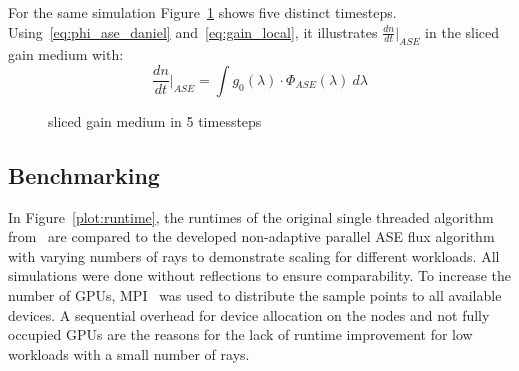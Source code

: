 For the same simulation Figure~\ref{graphic:benchmark_4_timeslices} shows five distinct timesteps.
Using~\eqref{eq:phi_ase_daniel} and~\eqref{eq:gain_local}, it illustrates ${\frac{dn}{dt}|}_{ASE}$ in the sliced gain medium with:
\begin{equation}
  \label{eq:dndt}
  \frac{dn}{dt}\bigg|_{ASE} = \int g_0(\lambda) \cdot \Phi_{ASE}(\lambda)~d\lambda
\end{equation}
\begin{figure}[H]
  \centerline{
    }
  \caption{sliced gain medium in 5 timessteps}
\label{graphic:benchmark_4_timeslices}
\end{figure}

\subsection{Benchmarking}
\label{subsec:benchmarking}
In Figure~\ref{plot:runtime}, the runtimes of the original single threaded
algorithm from~\cite{ASE2010} are compared to the developed non-adaptive
parallel ASE flux algorithm with varying numbers of rays to demonstrate
scaling for different workloads. All simulations were done without
reflections to ensure comparability. To increase the number of GPUs, MPI~\cite{MPI} was used to distribute the
sample points to all available devices. A sequential overhead for device
allocation 
on the nodes and not fully occupied GPUs are the reasons for the lack of runtime
improvement for low workloads with a small number of rays.

